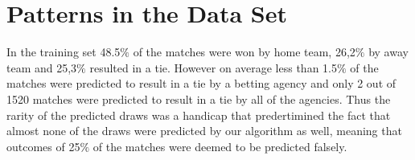 \documentclass[11pt]{article}
\begin{document}
\section{Patterns in the Data Set}

In the training set 48.5$\%$ of the matches were won by home team, 26,2$\%$ by away team and 25,3$\%$ resulted in a tie. However on average less than 1.5$\%$ of the matches were predicted to result in a tie by a betting agency and only 2 out of 1520 matches were predicted to result in a tie by all of the agencies. Thus the rarity of the predicted draws was a handicap that predertimined the fact that almost none of the draws were predicted by our algorithm as well, meaning that outcomes of 25$\%$ of the matches were deemed to be predicted falsely.  
\end{document}
